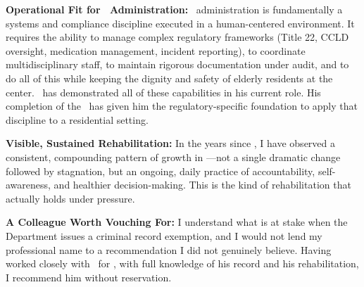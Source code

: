 \textbf{Operational Fit for \FacilityTypeShort\ Administration:} \FacilityTypeShort\ administration is fundamentally a systems and compliance discipline executed in a human-centered environment. It requires the ability to manage complex regulatory frameworks (Title 22, CCLD oversight, medication management, incident reporting), to coordinate multidisciplinary staff, to maintain rigorous documentation under audit, and to do all of this while keeping the dignity and safety of elderly residents at the center. \ApplicantName\ has demonstrated all of these capabilities in his current role. His completion of the \RCFETraining\ has given him the regulatory-specific foundation to apply that discipline to a residential setting.

\textbf{Visible, Sustained Rehabilitation:} In the years since \IncidentTwoDate, I have observed a consistent, compounding pattern of growth in \ApplicantName---not a single dramatic change followed by stagnation, but an ongoing, daily practice of accountability, self-awareness, and healthier decision-making. This is the kind of rehabilitation that actually holds under pressure.

\textbf{A Colleague Worth Vouching For:} I understand what is at stake when the Department issues a criminal record exemption, and I would not lend my professional name to a recommendation I did not genuinely believe. Having worked closely with \ApplicantName\ for \RefBKnownDuration, with full knowledge of his record and his rehabilitation, I recommend him without reservation.

\licsignatureblock
